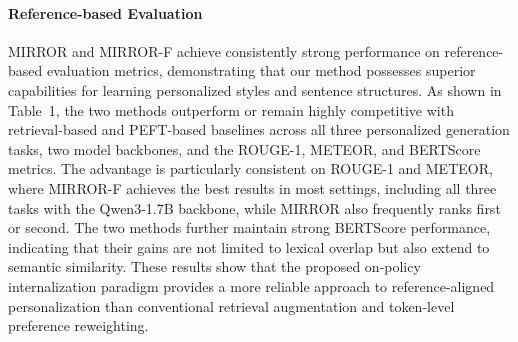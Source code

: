 \documentclass{article} %
\begin{document}
\paragraph{Reference-based Evaluation} MIRROR and MIRROR-F achieve consistently strong performance on reference-based evaluation metrics, demonstrating that our method possesses superior capabilities for learning personalized styles and sentence structures. As shown in Table~1, the two methods outperform or remain highly competitive with retrieval-based and PEFT-based baselines across all three personalized generation tasks, two model backbones, and the ROUGE-1, METEOR, and BERTScore metrics. The advantage is particularly consistent on ROUGE-1 and METEOR, where MIRROR-F achieves the best results in most settings, including all three tasks with the Qwen3-1.7B backbone, while MIRROR also frequently ranks first or second. The two methods further maintain strong BERTScore performance, indicating that their gains are not limited to lexical overlap but also extend to semantic similarity. These results show that the proposed on-policy internalization paradigm provides a more reliable approach to reference-aligned personalization than conventional retrieval augmentation and token-level preference reweighting.
\end{document}
